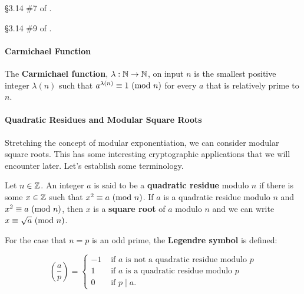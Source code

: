		\begin{problem}[10 points]
			\S3.14 \#7 of \cite{tw}.
		\end{problem}

		\begin{problem}[10 points]
			\S3.14 \#9 of \cite{tw}.
		\end{problem}

		\paragraph*{Carmichael Function}

\begin{definition}
	The {\bf Carmichael function}, $\lambda:\mathbb{N}\to\mathbb{N}$, on input $n$ is the smallest positive integer $\lambda(n)$ such that $a^{\lambda(n)} \equiv 1\mbox{\ $\left(\mathrm{mod}\ {n}\right)$}$ for every $a$ that is relatively prime to $n$.
\end{definition}


		\paragraph*{Quadratic Residues and Modular Square Roots}

		Stretching the concept of modular exponentiation, we can consider modular square roots. This has some interesting cryptographic applications that we will encounter later. Let's establish some terminology.


\begin{definition}
Let $n\in\mathbb{Z}$. An integer $a$ is said to be a {\bf quadratic residue} modulo $n$ if there is some $x\in\mathbb{Z}$ such that $x^2 \equiv a \mbox{\ $\left(\mathrm{mod}\ {n}\right)$}$. If $a$ is a quadratic residue modulo $n$ and $x^2 \equiv a \mbox{\ $\left(\mathrm{mod}\ {n}\right)$}$, then $x$ is a {\bf square root} of $a$ modulo $n$ and we can write $x \equiv \sqrt{a} \mbox{\ $\left(\mathrm{mod}\ {n}\right)$}$.

For the case that $n=p$ is an odd prime, the {\bf Legendre symbol} is defined:

$$\left(\frac{a}{p}\right)  = \left\{\begin{array}{rl}
-1 & \mbox{ if } a \mbox{ is not a quadratic residue modulo } p\\
 1 & \mbox{ if } a \mbox{ is a quadratic residue modulo } p\\
 0 & \mbox{ if } p\mid a.
\end{array}\right.$$
\end{definition}



